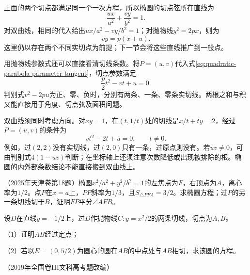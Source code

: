 上面的两个切点都满足同一个一次方程，所以椭圆的切点弦所在直线为
\begin{equation}\label{eq:quadratic-ellipse-contact-chord}
 \frac{ux}{a^2}+\frac{vy}{b^2}=1.
\end{equation}
对双曲线，相同的代入给出\(ux/a^2-vy/b^2=1\)；对抛物线\(y^2=2px\)，则为
\begin{equation}\label{eq:quadratic-parabola-contact-chord}
 vy=p(x+u).
\end{equation}
这里仍以存在两个不同实切点为前提；下一节会将这些直线推广到一般点。

用抛物线参数式还可以直接看清切线条数。将\(P=(u,v)\)代入式\eqref{eq:quadratic-parabola-parameter-tangent}，切点参数满足
\begin{equation}\label{eq:quadratic-parabola-tangent-parameters}
 \frac p2t^2-vt+u=0.
\end{equation}
判别式\(v^2-2pu\)为正、零、负时，分别有两条、一条、零条实切线。两根之和与积又能直接用于角度、切点弦及面积问题。

双曲线须同时考虑方向。对\(xy=1\)，在\((t,1/t)\)处的切线是\(x/t+ty=2\)，经过\(P=(u,v)\)的条件为
\begin{equation*}
 vt^2-2t+u=0,\qquad t\ne0.
\end{equation*}
例如，过\((2,2)\)没有实切线，过\((2,0)\)只有一条，过原点则没有。若\(uv\ne0\)，可由判别式\(4(1-uv)\)判断；在坐标轴上还须注意次数降低或出现被排除的根。椭圆的内外部条数结论不能直接搬到双曲线上。

\par\noindent\begin{minipage}{\linewidth}
\begin{example}
（2025年天津卷第18题）椭圆\(x^2/a^2+y^2/b^2=1\)的左焦点为\(F\)，右顶点为\(A\)，离心率为\(1/2\)。点\(P\)在\(x=a\)上，\(PF\)斜率为\(1/3\)，且\(S_{\triangle PFA}=3/2\)。求椭圆方程；过\(P\)的另一条切线切于\(B\)，证明\(FP\)平分\(\angle AFB\)。
\end{example}
\end{minipage}\par

\par\noindent\begin{minipage}{\linewidth}
\begin{example}\label{ex:quadratic-gaokao-parabola-contact}
设\(D\)在直线\(y=-1/2\)上，过\(D\)作抛物线\(C:y=x^2/2\)的两条切线，切点为\(A,B\)。

（1）证明\(AB\)经过定点；

（2）若以\(E=(0,5/2)\)为圆心的圆在\(AB\)的中点处与\(AB\)相切，求该圆的方程。

（2019年全国卷III文科高考题改编）
\end{example}
\end{minipage}\par


